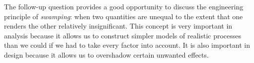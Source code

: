 The follow-up question provides a good opportunity to discuss the engineering principle of {\it swamping}: when two quantities are unequal to the extent that one renders the other relatively insignificant.  This concept is very important in analysis because it allows us to construct simpler models of realistic processes than we could if we had to take every factor into account.  It is also important in design because it allows us to overshadow certain unwanted effects.





